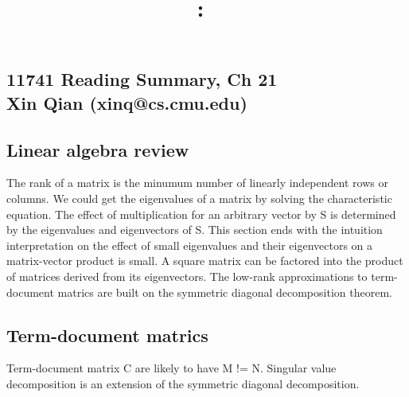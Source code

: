 \documentclass[12pt]{article}
\title{
\textmd{\textbf{\hmwkClass:\ \hmwkTitle}
}}
\author{\textbf{\hmwkAuthorName}}
\begin{document}
\subsection{11741 Reading Summary, Ch 21 \\Xin Qian (xinq@cs.cmu.edu)}
\subsection{Linear algebra review}
The rank of a matrix is the minumum number of linearly independent rows or columns. We could get the eigenvalues of a matrix by solving the characteristic equation. The effect of multiplication for an arbitrary vector by S is determined by the eigenvalues and eigenvectors of S. This section ends with the intuition interpretation on the effect of small eigenvalues and their eigenvectors on a matrix-vector product is small. A square matrix can be factored into the product of matrices derived from its eigenvectors. The low-rank approximations to term-document matrics are built on the symmetric diagonal decomposition theorem.
\subsection{Term-document matrics}
Term-document matrix C are likely to have M != N. Singular value decomposition is an extension of the symmetric diagonal decomposition. 




\end{document}
